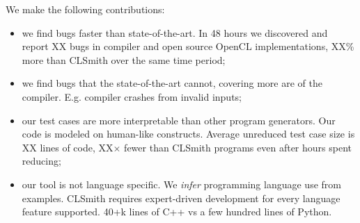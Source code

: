 \noindent We make the following contributions:
%
\begin{itemize}
\item we find bugs faster than state-of-the-art. In 48 hours we discovered and report XX bugs in compiler and open source OpenCL implementations, XX\% more than CLSmith over the same time period;
\item we find bugs that the state-of-the-art cannot, covering more are of the compiler. E.g. compiler crashes from invalid inputs;
\item our test cases are more interpretable than other program generators. Our code is modeled on human-like constructs. Average unreduced test case size is XX lines of code, XX$\times$ fewer than CLSmith programs even after hours spent reducing;
\item our tool is not language specific. We \emph{infer} programming language use from examples. CLSmith requires expert-driven development for every language feature supported. 40+k lines of C++ vs a few hundred lines of Python.
\end{itemize}
